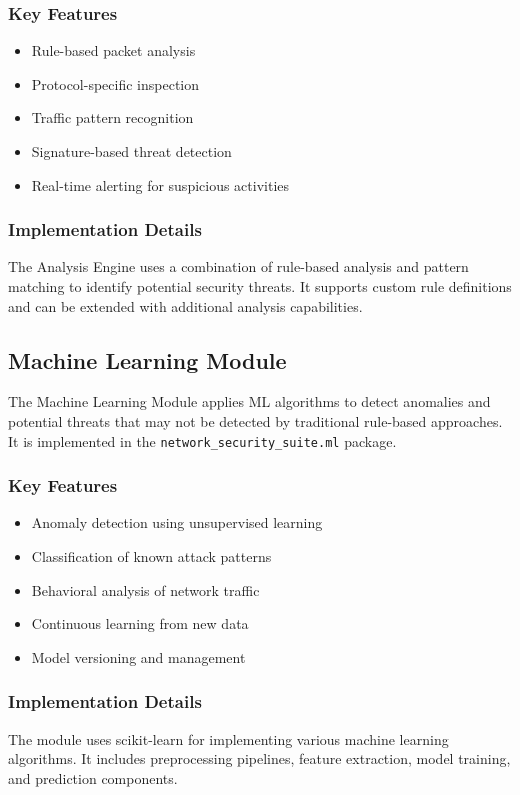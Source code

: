 \subsubsection{Key Features}
\begin{itemize}
    \item Rule-based packet analysis
    \item Protocol-specific inspection
    \item Traffic pattern recognition
    \item Signature-based threat detection
    \item Real-time alerting for suspicious activities
\end{itemize}

\subsubsection{Implementation Details}
The Analysis Engine uses a combination of rule-based analysis and pattern matching to identify potential security threats. It supports custom rule definitions and can be extended with additional analysis capabilities.

\subsection{Machine Learning Module}
The Machine Learning Module applies ML algorithms to detect anomalies and potential threats that may not be detected by traditional rule-based approaches. It is implemented in the \texttt{network\_security\_suite.ml} package.

\subsubsection{Key Features}
\begin{itemize}
    \item Anomaly detection using unsupervised learning
    \item Classification of known attack patterns
    \item Behavioral analysis of network traffic
    \item Continuous learning from new data
    \item Model versioning and management
\end{itemize}

\subsubsection{Implementation Details}
The module uses scikit-learn for implementing various machine learning algorithms. It includes preprocessing pipelines, feature extraction, model training, and prediction components.

